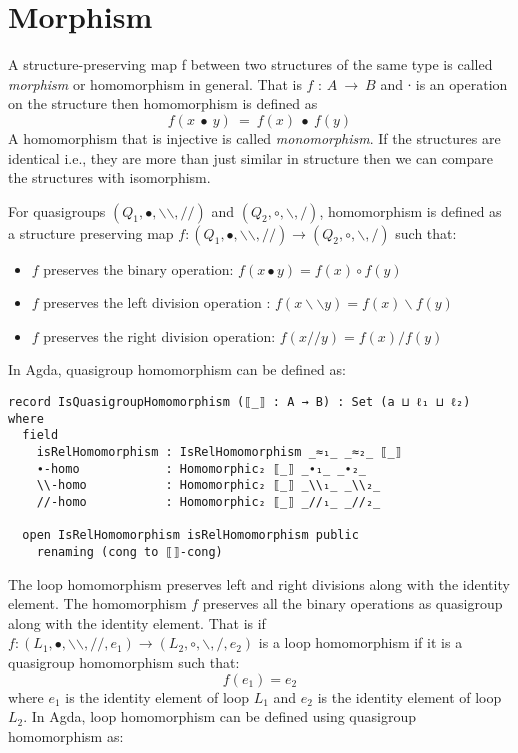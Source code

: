 \section{Morphism}
A structure-preserving map f between two structures of the same type is called
\textit{morphism} or homomorphism in general. That is \(f\) : \(A \ \rightarrow \
B\) and ∙ is an operation on the structure then homomorphism is defined as
\[f(x\  ∙ \  y) \ = \ f(x) \ ∙ \  f(y)\] A homomorphism that is injective is
called \textit{monomorphism}. If the structures are identical i.e., they are
more than just similar in structure then we can compare the structures with
isomorphism.

For quasigroups $(Q_1,∙,\backslash \backslash ,//)$ and $(Q_2,\circ,\backslash ,/)$,
homomorphism is defined as a structure preserving map \( f:(Q_1,∙,\backslash
\backslash,//) \rightarrow (Q_2,\circ,\backslash,/) \) such that:
\begin{itemize}
  \item $f$ preserves the binary operation: $f(x∙y) = f(x) \circ f(y)$
  \item $f$ preserves the left division operation : $f(x\backslash \backslash y) = f(x)\backslash f(y)$
  \item $f$ preserves the right division operation: $f(x//y) = f(x)/f(y)$
\end{itemize}
In Agda, quasigroup homomorphism can be defined as:

\begin{verbatim}
record IsQuasigroupHomomorphism (⟦_⟧ : A → B) : Set (a ⊔ ℓ₁ ⊔ ℓ₂) where
  field
    isRelHomomorphism : IsRelHomomorphism _≈₁_ _≈₂_ ⟦_⟧
    ∙-homo            : Homomorphic₂ ⟦_⟧ _∙₁_ _∙₂_
    \\-homo           : Homomorphic₂ ⟦_⟧ _\\₁_ _\\₂_
    //-homo           : Homomorphic₂ ⟦_⟧ _//₁_ _//₂_

  open IsRelHomomorphism isRelHomomorphism public
    renaming (cong to ⟦⟧-cong)
\end{verbatim}

The loop homomorphism preserves left and right divisions along with the identity
element. The homomorphism $f$ preserves all the binary operations as quasigroup
along with the identity element. That is if \( f:(L_1,∙,\backslash
\backslash,//,e_1) \rightarrow (L_2,\circ,\backslash,/,e_2) \) is a loop homomorphism if
it is a quasigroup homomorphism such that: 
\[f(e_1) = e_2\] where $e_1$ is the identity element of loop $L_1$ and $e_2$ is
the identity element of loop $L_2$. In Agda, loop homomorphism can be defined
using quasigroup homomorphism as:


